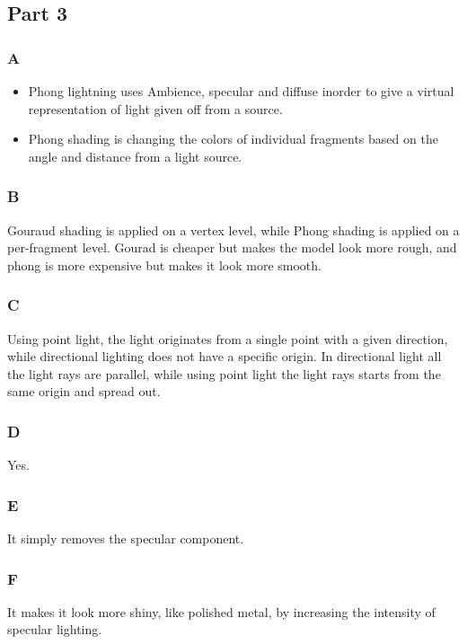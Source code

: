 \documentclass[11pt]{article}
\begin{document}
\subsection{Part 3}
\subsubsection{A}
\begin{itemize}
	\item Phong lightning uses Ambience, specular and diffuse inorder to give a virtual representation of light given off from a source.
	\item Phong shading is changing the colors of individual fragments based on the angle and distance from a light source.
\end{itemize}



\subsubsection{B}
Gouraud shading is applied on a vertex level, while Phong shading is applied on a per-fragment level. Gourad is cheaper but makes the model look more rough, and phong is more expensive but makes it look more smooth.


\subsubsection{C}
Using point light, the light originates from a single point with a given direction, while directional lighting does not have a specific origin. In directional light all the light rays are parallel, while using point light the light rays starts from the same origin and spread out.


\subsubsection{D}
Yes.


\subsubsection{E}
It simply removes the specular component.


\subsubsection{F}
It makes it look more shiny, like polished metal, by increasing the intensity of specular lighting.
\end{document}

